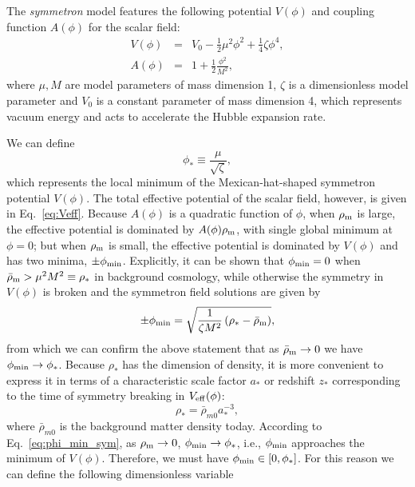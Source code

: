 The \textit{symmetron} \cite{Hinterbichler:2010es,Hinterbichler:2011ca} model features the following potential $V(\phi)$ and coupling function $A(\phi)$ for the scalar field:
\begin{eqnarray}\label{eq:sym_potential}
    V(\phi) &=& V_0 - \frac{1}{2}\mu^2\phi^2 + \frac{1}{4}\zeta\phi^4,\\
    \label{eq:sym_coupling_function} A(\phi) &=& 1+ \frac{1}{2}\frac{\phi^2}{M^2},
\end{eqnarray}
where $\mu, M$ are model parameters of mass dimension 1, $\zeta$ is a dimensionless model parameter and $V_0$ is a constant parameter of mass dimension 4, which represents vacuum energy and acts to accelerate the Hubble expansion rate.

We can define 
\begin{equation}
    \phi_\ast \equiv \frac{\mu}{\sqrt{\zeta}},
\end{equation}
which represents the local minimum of the Mexican-hat-shaped symmetron potential $V(\phi)$. The total effective potential of the scalar field, however, is given in Eq.~\eqref{eq:Veff}. Because $A(\phi)$ is a quadratic function of $\phi$, when $\rho_{\rm m}$ is large, the effective potential is dominated by $A(\phi)\rho_{\rm m}$, with single global minimum at $\phi=0$; but when $\rho_{\rm m}$ is small, the effective potential is dominated by $V(\phi)$ and has two minima, $\pm\phi_{\rm min}$.  Explicitly, it can be shown that $\phi_{\rm min}=0$ when $\bar{\rho}_{\rm m}>\mu^2M^2\equiv\rho_\ast$ in background cosmology, while otherwise the symmetry in $V(\phi)$ is broken and the symmetron field solutions are given by
\begin{equation}\label{eq:phi_min_sym}
    \pm\phi_{\rm min} = \sqrt{\frac{1}{\zeta{M}^2}\left(\rho_\ast-\bar{\rho}_{\rm m}\right)},
\end{equation}
from which we can confirm the above statement that as $\bar{\rho}_{\rm m}\rightarrow0$ we have $\phi_{\rm min}\rightarrow\phi_\ast$. Because $\rho_\ast$ has the dimension of density, it is more convenient to express it in terms of a characteristic scale factor $a_\ast$ or redshift $z_\ast$ corresponding to the time of symmetry breaking in $V_{\rm eff}(\phi)$:
\begin{equation}
    \rho_\ast = \bar{\rho}_{m0}a^{-3}_\ast,
\end{equation}
where $\bar{\rho}_{m0}$ is the background matter density today. According to Eq.~\eqref{eq:phi_min_sym}, as $\rho_{\rm m}\rightarrow0$, $\phi_{\rm min}\rightarrow\phi_\ast$, i.e., $\phi_{\rm min}$ approaches the minimum of $V(\phi)$. Therefore, we must have $\phi_{\rm min}\in[0,\phi_\ast]$. For this reason we can define the following dimensionless variable
